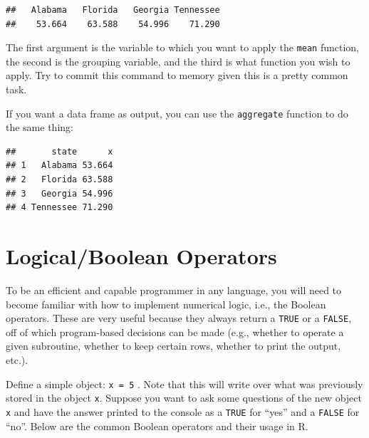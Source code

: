 \documentclass[]{book}
\newenvironment{Shaded}{\begin{snugshade}}{\end{snugshade}}
\newcommand{\DataTypeTok}[1]{\textcolor[rgb]{0.13,0.29,0.53}{#1}}
\newcommand{\KeywordTok}[1]{\textcolor[rgb]{0.13,0.29,0.53}{\textbf{#1}}}
\newcommand{\NormalTok}[1]{#1}
\newcommand{\OperatorTok}[1]{\textcolor[rgb]{0.81,0.36,0.00}{\textbf{#1}}}
\begin{document}
\begin{Shaded}
\end{Shaded}

\begin{verbatim}
##   Alabama   Florida   Georgia Tennessee 
##    53.664    63.588    54.996    71.290
\end{verbatim}

The first argument is the variable to which you want to apply the \texttt{mean} function, the second is the grouping variable, and the third is what function you wish to apply. Try to commit this command to memory given this is a pretty common task.

If you want a data frame as output, you can use the \texttt{aggregate} function to do the same thing:

\begin{Shaded}
\end{Shaded}

\begin{verbatim}
##       state      x
## 1   Alabama 53.664
## 2   Florida 63.588
## 3   Georgia 54.996
## 4 Tennessee 71.290
\end{verbatim}

\hypertarget{logicalboolean-operators}{%
\section{Logical/Boolean Operators}\label{logicalboolean-operators}}

To be an efficient and capable programmer in any language, you will need to become familiar with how to implement numerical logic, i.e., the Boolean operators. These are very useful because they always return a \texttt{TRUE} or a \texttt{FALSE}, off of which program-based decisions can be made (e.g., whether to operate a given subroutine, whether to keep certain rows, whether to print the output, etc.).

Define a simple object: \texttt{x\ =\ 5} . Note that this will write over what was previously stored in the object \texttt{x}. Suppose you want to ask some questions of the new object \texttt{x} and have the answer printed to the console as a \texttt{TRUE} for ``yes'' and a \texttt{FALSE} for ``no''. Below are the common Boolean operators and their usage in R.
\end{document}
